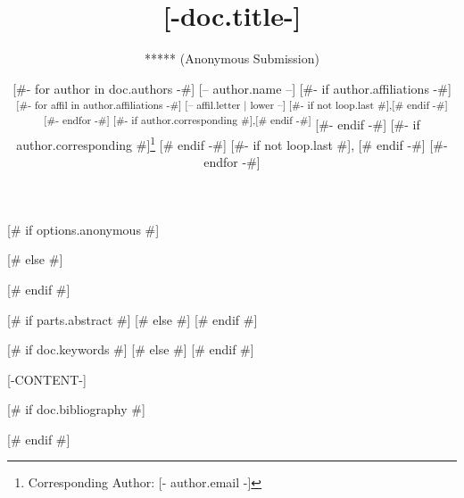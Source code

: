 \documentclass{isprs} %
\begin{document}
\title{[-doc.title-]}
\date{}


[# if options.anonymous #]
\author{***** (Anonymous Submission)}
\address{**** (Anonymous Submission)}
[# else #]
\author{
[#- for author in doc.authors -#]
[-- author.name --]
[#- if author.affiliations -#]
\textsuperscript{
	[#- for affil in author.affiliations -#]
		[-- affil.letter | lower --]
		[#- if not loop.last #],[# endif -#]
	[#- endfor -#]
[#- if author.corresponding #],[# endif -#]
}
[#- endif -#]
[#- if author.corresponding #]\thanks{Corresponding Author: [- author.email -]} [# endif -#]
[#- if not loop.last #], [# endif -#]
[#- endfor -#]
}
\address{
	[#- for affil in doc.affiliations -#]
	\textsuperscript{[- affil.letter | lower -]}
	[-affil.value.name-]
	[#- endfor -#]
}
[# endif #]



\icwg{}   %

[# if parts.abstract #]
[# else #]
[# endif #]

[# if doc.keywords #]
[# else #]
\keywords{}
[# endif #]

\maketitle


[-CONTENT-]

[# if doc.bibliography #]
{
	\begin{spacing}{1.17}
		\normalsize
	\end{spacing}
}
[# endif #]
\end{document}
